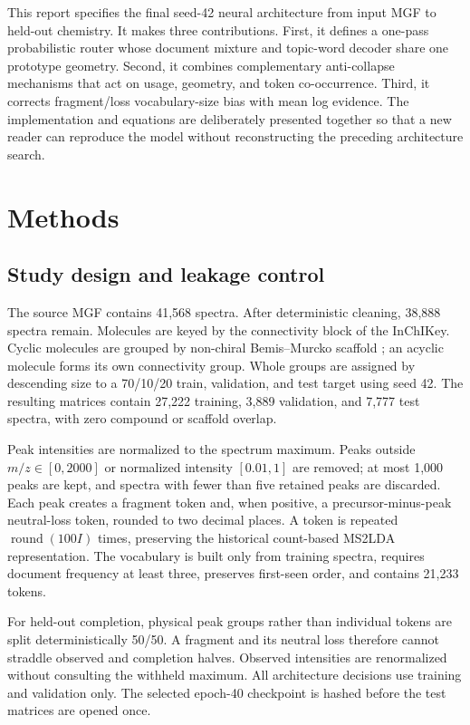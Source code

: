\documentclass[10pt,a4paper]{article}
\begin{document}
This report specifies the final seed-42 neural architecture from input MGF to
held-out chemistry. It makes three contributions. First, it defines a one-pass
probabilistic router whose document mixture and topic-word decoder share one
prototype geometry. Second, it combines complementary anti-collapse mechanisms
that act on usage, geometry, and token co-occurrence. Third, it corrects
fragment/loss vocabulary-size bias with mean log evidence. The implementation
and equations are deliberately presented together so that a new reader can
reproduce the model without reconstructing the preceding architecture search.

\section{Methods}

\subsection{Study design and leakage control}

The source MGF contains 41,568 spectra. After deterministic cleaning, 38,888
spectra remain. Molecules are keyed by the connectivity block of the InChIKey.
Cyclic molecules are grouped by non-chiral Bemis--Murcko scaffold
\cite{bemismurcko1996}; an acyclic molecule forms its own connectivity group.
Whole groups are assigned by descending size to a 70/10/20 train,
validation, and test target using seed 42. The resulting matrices contain
27,222 training, 3,889 validation, and 7,777 test spectra, with zero compound
or scaffold overlap.

Peak intensities are normalized to the spectrum maximum. Peaks outside
$m/z\in[0,2000]$ or normalized intensity $[0.01,1]$ are removed; at most 1,000
peaks are kept, and spectra with fewer than five retained peaks are discarded.
Each peak creates a fragment token and, when positive, a precursor-minus-peak
neutral-loss token, rounded to two decimal places. A token is repeated
$\operatorname{round}(100I)$ times, preserving the historical count-based
MS2LDA representation. The vocabulary is built only from training spectra,
requires document frequency at least three, preserves first-seen order, and
contains 21,233 tokens.

For held-out completion, physical peak groups rather than individual tokens are
split deterministically 50/50. A fragment and its neutral loss therefore cannot
straddle observed and completion halves. Observed intensities are renormalized
without consulting the withheld maximum. All architecture decisions use
training and validation only. The selected epoch-40 checkpoint is hashed before
the test matrices are opened once.
\end{document}
